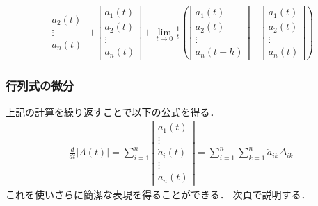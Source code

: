 \documentclass[10pt,hyperref={unicode}]{beamer}
\newcommand{\absolute}[1]{\left|#1\right|}
\newcommand{\parentheses}[1]{\left(#1\right)}
\begin{document}
\begin{frame}
\begin{align*}
{\begin{array}{c}
                a_2\parentheses{t} \\
                \vdots \\
                a_n\parentheses{t}
            \end{array}
    }
    +
    \absolute{%
            \begin{array}{c}
                a_1\parentheses{t} \\
                \dot{a}_2\parentheses{t} \\
                \vdots \\
                a_n\parentheses{t}
            \end{array}
    }
    + \lim_{t \to 0}\frac{1}{t}
    \parentheses{%
        \absolute{%
            \begin{array}{c}
                a_1\parentheses{t} \\
                a_2\parentheses{t} \\
                \vdots \\
                a_n\parentheses{t + h}
            \end{array}
        }
        -
        \absolute{%
            \begin{array}{c}
                a_1\parentheses{t} \\
                a_2\parentheses{t} \\
                \vdots \\
                a_n\parentheses{t}
            \end{array}
        }
    }
\end{align*}
\end{frame}

\begin{frame}
\frametitle{行列式の微分}
上記の計算を繰り返すことで以下の公式を得る．
\begin{align*}
    \frac{d}{dt}\absolute{A\parentheses{t}}
    = \sum_{i = 1}^n \absolute{%
        \begin{array}{c}
            a_1\parentheses{t} \\
            \vdots \\
            \dot{a}_i\parentheses{t} \\
            \vdots \\
            a_n\parentheses{t}
        \end{array}
    }
    = \sum_{i = 1}^n \sum_{k = 1}^n \dot{a}_{ik} \varDelta_{ik}
\end{align*}
これを使いさらに簡潔な表現を得ることができる．
次頁で説明する．
\end{frame}
\end{document}
